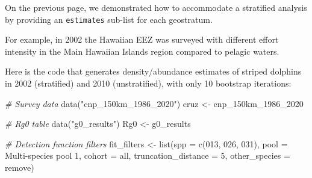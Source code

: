 \documentclass[
]{book}
\newenvironment{Shaded}{\begin{snugshade}}{\end{snugshade}}
\newcommand{\AttributeTok}[1]{\textcolor[rgb]{0.77,0.63,0.00}{#1}}
\newcommand{\CommentTok}[1]{\textcolor[rgb]{0.56,0.35,0.01}{\textit{#1}}}
\newcommand{\DecValTok}[1]{\textcolor[rgb]{0.00,0.00,0.81}{#1}}
\newcommand{\FunctionTok}[1]{\textcolor[rgb]{0.00,0.00,0.00}{#1}}
\newcommand{\NormalTok}[1]{#1}
\newcommand{\OtherTok}[1]{\textcolor[rgb]{0.56,0.35,0.01}{#1}}
\newcommand{\StringTok}[1]{\textcolor[rgb]{0.31,0.60,0.02}{#1}}
\begin{document}
On the previous page, we demonstrated how to accommodate a stratified analysis by providing an \texttt{estimates} sub-list for each geostratum.

For example, in 2002 the Hawaiian EEZ was surveyed with different effort intensity in the Main Hawaiian Islands region compared to pelagic waters.

Here is the code that generates density/abundance estimates of striped dolphins in 2002 (stratified) and 2010 (unstratified), with only 10 bootstrap iterations:

\begin{Shaded}
\begin{Highlighting}[]
\CommentTok{\# Survey data}
\FunctionTok{data}\NormalTok{(}\StringTok{"cnp\_150km\_1986\_2020"}\NormalTok{)}
\NormalTok{cruz }\OtherTok{\textless{}{-}}\NormalTok{ cnp\_150km\_1986\_2020}

\CommentTok{\# Rg0 table}
\FunctionTok{data}\NormalTok{(}\StringTok{"g0\_results"}\NormalTok{)}
\NormalTok{Rg0 }\OtherTok{\textless{}{-}}\NormalTok{ g0\_results}

\CommentTok{\# Detection function filters}
\NormalTok{fit\_filters }\OtherTok{\textless{}{-}} \FunctionTok{list}\NormalTok{(}\AttributeTok{spp =} \FunctionTok{c}\NormalTok{(}\StringTok{\textquotesingle{}013\textquotesingle{}}\NormalTok{, }\StringTok{\textquotesingle{}026\textquotesingle{}}\NormalTok{, }\StringTok{\textquotesingle{}031\textquotesingle{}}\NormalTok{), }
                   \AttributeTok{pool =} \StringTok{\textquotesingle{}Multi{-}species pool 1\textquotesingle{}}\NormalTok{,}
                   \AttributeTok{cohort =} \StringTok{\textquotesingle{}all\textquotesingle{}}\NormalTok{,}
                   \AttributeTok{truncation\_distance =} \DecValTok{5}\NormalTok{,}
                   \AttributeTok{other\_species =} \StringTok{\textquotesingle{}remove\textquotesingle{}}\NormalTok{)}


\end{Highlighting}
\end{Shaded}
\end{document}
